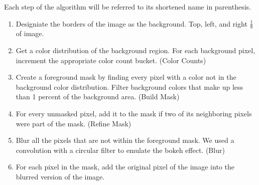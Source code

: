 \documentclass[12pt]{article}
\begin{document}
Each step of the algorithm will be referred to its shortened name in
parenthesis.
\begin{enumerate}
    \item
        Designiate the borders of the image as the background. Top, left, and
        right $\tfrac{1}{8}$ of image.
    \item
        Get a color distribution of the background region. For each background
        pixel, increment the appropriate color count bucket. (Color Counts)
    \item
        Create a foreground mask by finding every pixel with a color not
        in the background color distribution. Filter background colors that
        make up less than 1 percent of the background area. (Build Mask)
    \item
        For every unmasked pixel, add it to the mask if two of its neighboring
        pixels were part of the mask. (Refine Mask)
    \item
        Blur all the pixels that are not within the foreground mask. We used a
        convolution with a circular filter to emulate the bokeh effect. (Blur)
    \item
        For each pixel in the mask, add the original pixel of the image into
        the blurred version of the image.
\end{enumerate}
\end{document}
